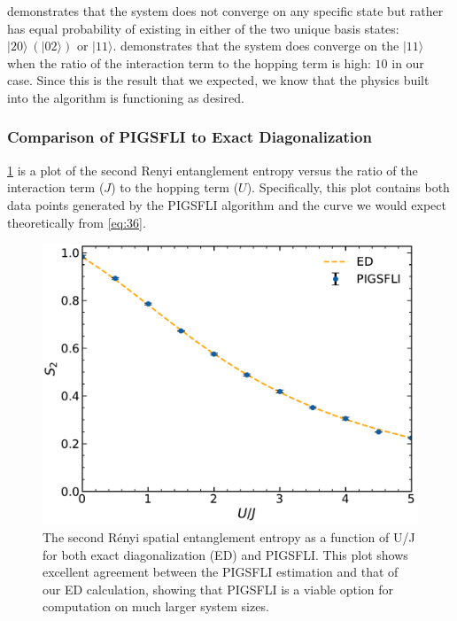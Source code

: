  demonstrates that the system does not converge on any specific state but rather has equal probability of existing in either of the two unique basis states: $|20\rangle\ \left(|02\rangle\right)$ or $|11\rangle$.  demonstrates that the system does converge on the $|11\rangle$ when the ratio of the interaction term to the hopping term is high: $10$ in our case. Since this is the result that we expected, we know that the physics built into the algorithm is functioning as desired.

\subsubsection{Comparison of PIGSFLI to Exact Diagonalization} \label{results}

\cref*{fig:renyi_spatial} is a plot of the second Renyi entanglement entropy versus the ratio of the interaction term ($J$) to the hopping term ($U$). Specifically, this plot contains both data points generated by the PIGSFLI algorithm and the curve we would expect theoretically from \cref{eq:36}.

\begin{figure}[H]
\centering
\includegraphics[scale=0.5]{../figures/renyi_spatial.pdf}
\caption{The second Rényi spatial entanglement entropy as a function of U/J for both exact diagonalization (ED) and PIGSFLI. This plot shows excellent agreement between the PIGSFLI estimation and that of our ED calculation, showing that PIGSFLI is a viable option for computation on much larger system sizes.}
\label{fig:renyi_spatial}
\end{figure}

